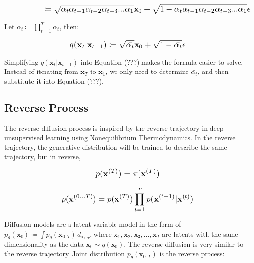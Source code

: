 \documentclass{article}
\newcommand*{\Scale}[2][4]{\scalebox{#1}{\ensuremath{#2}}}
\begin{document}
\begin{equation}
\Scale[1.2]{ \displaystyle
\hspace{4.75em} \coloneq \sqrt{\alpha_t \alpha_{t-1} \alpha_{t-2} \alpha_{t-3} ... \alpha_{1}} \textbf{x}_{0} + \sqrt{1-\alpha_t\alpha_{t-1}\alpha_{t-2}\alpha_{t-3}...\alpha_{1}} \epsilon }
\end{equation}

Let $ \bar{\alpha_t} \coloneq \displaystyle \prod_{t=1}^{T} \alpha_t $, then:

\begin{equation}
\Scale[1.2]{ \displaystyle
q(\textbf{x}_{t}|\textbf{x}_{t-1}) \coloneq \sqrt{\bar{\alpha_t}} \textbf{x}_{0} + \sqrt{1-\bar{\alpha_t}} \epsilon }
\end{equation}

Simplifying $ q(\textbf{x}_{t}|\textbf{x}_{t-1}) $ into Equation (???) makes the formula easier to solve. Instead of iterating from $ \textbf{x}_{T} $ to $ \textbf{x}_{1} $, we only need to determine $ \bar{\alpha_t} $, and then substitute it into Equation (???).

\subsection{Reverse Process}


The reverse diffusion process is inspired by the reverse trajectory in deep unsupervised learning using Nonequilibrium Thermodynamics. In the reverse trajectory, the generative distribution will be trained to describe the same trajectory, but in reverse,

\begin{equation}
    \Scale[1.2]{ \displaystyle
        p(\textbf{x}^{(T)}) = \pi(\textbf{x}^{(T)})
    }
\end{equation}

\begin{equation}
    \Scale[1.2]{ \displaystyle
        p(\textbf{x}^{(0...T)}) = p(\textbf{x}^{(T)}) \prod_{t=1}^{T} p(\textbf{x}^{(t-1)}|\textbf{x}^{(t)})
    }
\end{equation}

Diffusion models are a latent variable model in the form of $ p_\theta(\textbf{x}_0) \coloneq \int p_\theta(\textbf{x}_{0:T}) \,d_{\textbf{x}_{1:T}} $, where $ \textbf{x}_1,\textbf{x}_2,\textbf{x}_3,...,\textbf{x}_T $ are latents with the same dimensionality as the data $ \textbf{x}_0 \sim q(\textbf{x}_0) $. The reverse diffusion is very similar to the reverse trajectory. Joint distribution $ p_\theta(\textbf{x}_{0:T}) $ is the reverse process:
\end{document}
